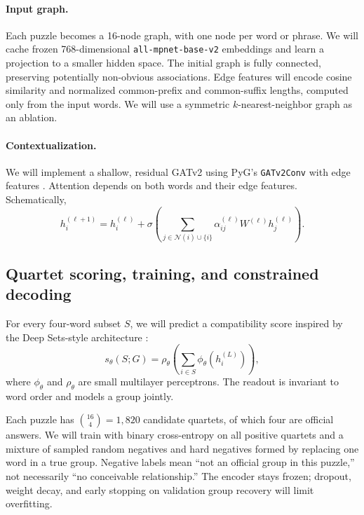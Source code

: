 \documentclass{article}
\begin{document}
\paragraph{Input graph.}
Each puzzle becomes a 16-node graph, with one node per word or phrase. We will cache frozen 768-dimensional \texttt{all-mpnet-base-v2} embeddings \citep{encoder} and learn a projection to a smaller hidden space. The initial graph is fully connected, preserving potentially non-obvious associations. Edge features will encode cosine similarity and normalized common-prefix and common-suffix lengths, computed only from the input words. We will use a symmetric $k$-nearest-neighbor graph as an ablation.

\paragraph{Contextualization.}
We will implement a shallow, residual GATv2 \citep{gatv2} using PyG's \texttt{GATv2Conv} with edge features \citep{pyg}. Attention depends on both words and their edge features. Schematically,
\begin{equation}
h_i^{(\ell+1)}=h_i^{(\ell)}+
\sigma\!\left(\sum_{j\in\mathcal N(i)\cup\{i\}}
\alpha_{ij}^{(\ell)}W^{(\ell)}h_j^{(\ell)}\right).
\end{equation}

\subsection{Quartet scoring, training, and constrained decoding}
For every four-word subset $S$, we will predict a compatibility score inspired by the Deep Sets-style architecture \citep{deepsets}:
\begin{equation}
s_\theta(S;G)=\rho_\theta\!\left(\sum_{i\in S}\phi_\theta(h_i^{(L)})\right),
\end{equation}
where $\phi_\theta$ and $\rho_\theta$ are small multilayer perceptrons. The readout is invariant to word order and models a group jointly.

Each puzzle has $\binom{16}{4}=1{,}820$ candidate quartets, of which four are official answers. We will train with binary cross-entropy on all positive quartets and a mixture of sampled random negatives and hard negatives formed by replacing one word in a true group. Negative labels mean ``not an official group in this puzzle,'' not necessarily ``no conceivable relationship.'' The encoder stays frozen; dropout, weight decay, and early stopping on validation group recovery will limit overfitting.
\end{document}
